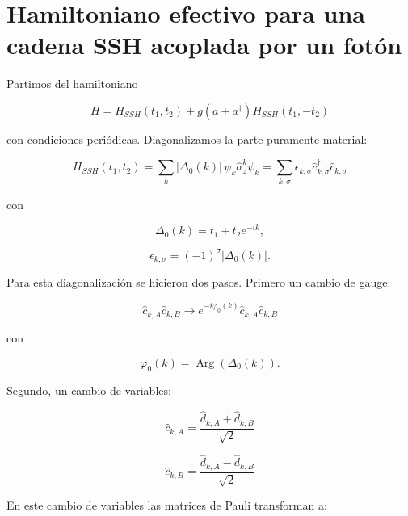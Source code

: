 \documentclass[11pt]{article}
\begin{document}
\section*{Hamiltoniano efectivo para una cadena SSH acoplada por un fotón}

Partimos del hamiltoniano

\begin{equation}
H = H_{SSH}(t_1, t_2) + g(a + a^\dagger) H_{SSH}(t_1, -t_2)
\end{equation}

con condiciones periódicas. Diagonalizamos la parte puramente material:

\begin{equation}
H_{SSH}(t_1, t_2)
=
\sum_k |\Delta_0(k)| \,
\psi_k^\dagger \hat{\sigma}_z^k \psi_k
=
\sum_{k,\sigma}
\epsilon_{k,\sigma}
\hat{c}_{k,\sigma}^\dagger
\hat{c}_{k,\sigma}
\end{equation}

con

\begin{equation}
\Delta_0(k) = t_1 + t_2 e^{-ik},
\end{equation}

\begin{equation}
\epsilon_{k,\sigma} = (-1)^\sigma |\Delta_0(k)|.
\end{equation}

Para esta diagonalización se hicieron dos pasos. Primero un cambio de gauge:

\begin{equation}
\hat{c}_{k,A}^\dagger \hat{c}_{k,B}
\rightarrow
e^{-i\varphi_0(k)}
\hat{c}_{k,A}^\dagger \hat{c}_{k,B}
\end{equation}

con

\begin{equation}
\varphi_0(k)
=
\operatorname{Arg}\left(\Delta_0(k)\right).
\end{equation}

Segundo, un cambio de variables:

\begin{equation}
\hat{c}_{k,A}
=
\frac{
\hat{d}_{k,A} + \hat{d}_{k,B}
}{\sqrt{2}}
\end{equation}

\begin{equation}
\hat{c}_{k,B}
=
\frac{
\hat{d}_{k,A} - \hat{d}_{k,B}
}{\sqrt{2}}
\end{equation}

En este cambio de variables las matrices de Pauli transforman a:
\end{document}
